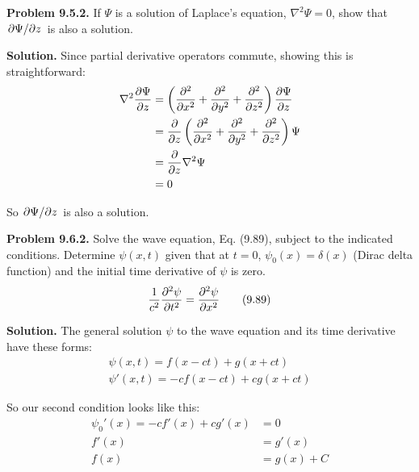 \documentclass{article}
\begin{document}
\insertTitle


\hrulefill

\textbf{Problem 9.5.2.} If $\Psi$ is a solution of Laplace's equation, $\nabla^2\Psi = 0$, show that $\pdv*{\Psi}{z}$ is also a solution.

\textbf{Solution.} Since partial derivative operators commute, showing this is straightforward:
\begin{equation*}
\begin{aligned}
    \nabla^2\pdv{\Psi}{z} &= \left(\pdv[2]{x} + \pdv[2]{y} + \pdv[2]{z}\right)\pdv{\Psi}{z} \\
    &= \pdv{z}\left(\pdv[2]{x} + \pdv[2]{y} + \pdv[2]{z}\right)\Psi \\
    &= \pdv{z}\nabla^2\Psi \\
    &= 0
\end{aligned}
\end{equation*}

So $\pdv*{\Psi}{z}$ is also a solution.

\hrulefill

\textbf{Problem 9.6.2.} Solve the wave equation, Eq. (9.89), subject to the indicated conditions. Determine $\psi(x,t)$ given that at $t=0$, $\psi_0(x) = \delta(x)$ (Dirac delta function) and the initial time derivative of $\psi$ is zero.
\begin{equation}
    \frac{1}{c^2}\pdv[2]{\psi}{t} = \pdv[2]{\psi}{x}\tag{9.89}\label{eq:9.89}
\end{equation}

\textbf{Solution.} The general solution $\psi$ to the wave equation and its time derivative have these forms:
\begin{equation*}
\begin{aligned}
    \psi(x,t) = f(x-ct) + g(x+ct) \\
    \psi'(x,t) = -cf(x-ct) + cg(x+ct)
\end{aligned}
\end{equation*}

So our second condition looks like this:
\begin{equation*}
\begin{aligned}
    \psi_0'(x) = -cf'(x) + cg'(x) &= 0 \\
    f'(x) &= g'(x) \\
    f(x) &= g(x) + C
\end{aligned}
\end{equation*}
\end{document}
